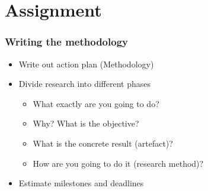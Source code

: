 \documentclass[aspectratio=169]{beamer}
\begin{document}
\section{Assignment}

\begin{frame}
  \frametitle{Writing the methodology}

  \begin{itemize}
    \item Write out action plan (Methodology)
    \item Divide research into different phases
          \begin{itemize}
            \item What exactly are you going to do?
            \item Why? What is the objective?
            \item What is the concrete result (artefact)?
            \item How are you going to do it (research method)?
          \end{itemize}
    \item Estimate milestones and deadlines
  \end{itemize}

\end{frame}
\end{document}
